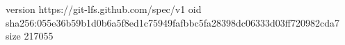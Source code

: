 version https://git-lfs.github.com/spec/v1
oid sha256:055e36b59b1d0b6a5f8ed1c75949fafbbc5fa28398dc06333d03ff720982cda7
size 217055

